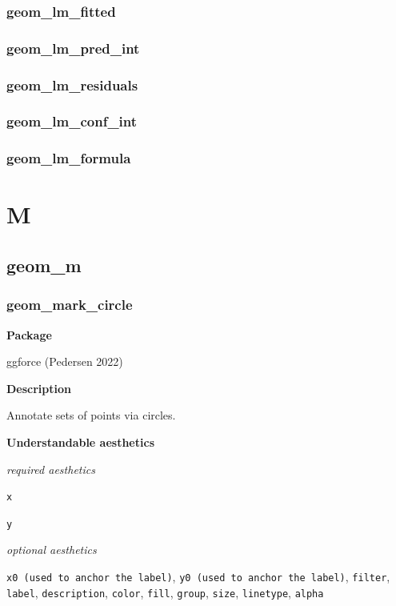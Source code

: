 \documentclass[
  letterpaper,
  DIV=11,
  numbers=noendperiod]{scrreprt}
\begin{document}
\section{geom\_lm\_fitted}\label{geom_lm_fitted}

\section{geom\_lm\_pred\_int}\label{geom_lm_pred_int}

\section{geom\_lm\_residuals}\label{geom_lm_residuals}

\section{geom\_lm\_conf\_int}\label{geom_lm_conf_int}

\section{geom\_lm\_formula}\label{geom_lm_formula}

\part{M}

\chapter{geom\_m}\label{sec-m}

\section{geom\_mark\_circle}\label{mark_circle}

\textbf{Package}

ggforce (Pedersen 2022)

\textbf{Description}

Annotate sets of points via circles.

\textbf{Understandable aesthetics}

\emph{required aesthetics}

\texttt{x}

\texttt{y}

\emph{optional aesthetics}

\texttt{x0\ (used\ to\ anchor\ the\ label)},
\texttt{y0\ (used\ to\ anchor\ the\ label)}, \texttt{filter},
\texttt{label}, \texttt{description}, \texttt{color}, \texttt{fill},
\texttt{group}, \texttt{size}, \texttt{linetype}, \texttt{alpha}
\end{document}
